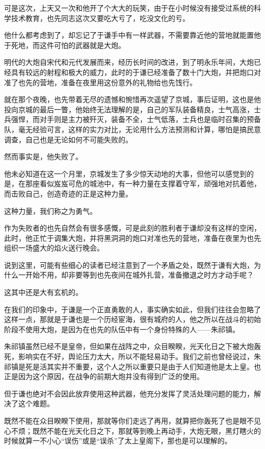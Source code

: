 \begin{multicols}{\theparacolNo}
可是这次，上天又一次和他开了个大大的玩笑，由于在小时候没有接受过系统的科学技术教育，也先同志这次又要吃大亏了，吃没文化的亏。

他什么都考虑到了，却忘记了于谦手中有一样武器，不需要靠近他的营地就能置他于死地，而这件可怕的武器就是大炮。

明代的大炮自宋代和元代发展而来，经历长时间的改进，到了明永乐年间，大炮已经具有较远的射程和极大的威力，此时的于谦已经准备了数十门大炮，并把炮口对准了也先的营地，准备在夜里用这份意外的礼物给也先饯行。

就在那个夜晚，也先带着无尽的遗憾和惋惜再次遥望了京城，事后证明，这也是他投向京城的最后一瞥，他始终无法理解的是，自己的军队装备精良，士气高涨，士兵强悍，而对手则是主力被歼灭，装备不全，士气低落，士兵也是临时召集的预备队，毫无经验可言，这样的实力对比，无论用什么方法预测和计算，哪怕是搞民意调查，自己也是无论如何不可能失败的。

然而事实是，他失败了。

他未必知道在这一个月里，京城发生了多少惊天动地的大事，但他可以感觉到的是，在那座看似岌岌可危的城池中，有一种力量在支撑着守军，顽强地对抗着他，而击败自己，创造奇迹的正是这种力量。

这种力量，我们称之为勇气。

作为失败者的也先自然会有很多感慨，可是此刻的胜利者于谦却没有这样的空闲，此时，他正忙于调集大炮，并将黑洞洞的炮口对准也先的营地，准备在夜里为也先组织一场盛大的焰火送行晚会。

说到这里，可能有些细心的读者已经注意到了一个矛盾之处，既然于谦有大炮，为什么一开始不用，却非要等到也先夜间在城外扎营，准备撤退之时方才动手呢？

这其中还是大有玄机的。

在我们的印象中，于谦是一个正直勇敢的人，事实确实如此，但我们往往会忽略了这样一点，那就是于谦也是一个历经宦海，很有城府的人，他之所以在战斗的初始阶段不使用大炮，是因为在也先的队伍中有一个身份特殊的人——朱祁镇。

朱祁镇虽然已经不是皇帝，但如果在战阵之中，众目睽睽，光天化日之下被大炮轰死，影响实在不好，舆论压力太大，所以不能轻易动手。我们之前也曾经说过，朱祁镇是死是活其实并不重要，这个人之所以重要只是由于人们知道他是太上皇。也正是因为这个原因，在战争的前期大炮并没有得到广泛的使用。

但于谦也绝对不会因此放弃使用这种武器，他充分发挥了灵活处理问题的能力，解决了这个难题。

既然不能在众目睽睽下使用，那就等你们走远了再用，就算把你轰死了也是眼不见心不烦；既然不能在光天化日之下，那就等到晚上再动手，大炮无眼，黑灯瞎火的时候就算一不小心“误伤”或是“误杀”了太上皇阁下，那也是可以理解的。


\end{multicols}
